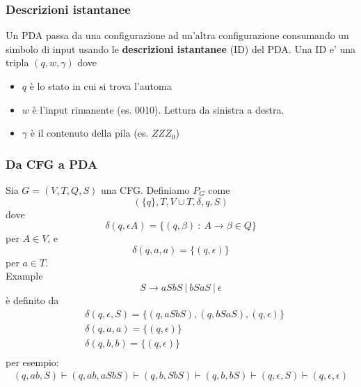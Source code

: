 \documentclass[12pt]{article}
\begin{document}
\subsubsection{Descrizioni istantanee}
Un PDA passa da una configurazione ad un’altra
configurazione consumando un simbolo di input usando le \textbf{descrizioni istantanee} (ID) del PDA. 
Una ID e’ una tripla $(q, w, \gamma)$ dove
\begin{itemize}
    \item $q$ è lo stato in cui si trova l'automa
    \item $w$ è l'input rimanente (es. 0010). Lettura da sinistra a destra.
    \item $\gamma$ è il contenuto della pila (es. $ZZZ_0$)
\end{itemize}

\subsubsection{Da CFG a PDA}
Sia $G=(V,T,Q,S)$ una CFG. Definiamo $P_G$ come
\begin{equation*}
    (\{q\},T,V \cup T,\delta,q,S)
\end{equation*}
dove
\begin{equation*}
    \delta(q,\epsilon A) = \{(q,\beta)\ :\ A \rightarrow \beta \in Q\}
\end{equation*}
per $A \in V$, e
\begin{equation*}
    \delta(q,a,a)=\{(q,\epsilon)\}
\end{equation*}
per $a \in T$.\\
Example
\begin{equation*}
    S \rightarrow aSbS\ |\ bSaS\ |\ \epsilon
\end{equation*}
è definito da
\begin{align*}
    &\delta(q,\epsilon,S)=\{(q,aSbS),(q,bSaS),(q,\epsilon)\}\\
    &\delta(q,a,a)=\{(q,\epsilon)\}\\
    &\delta(q,b,b)=\{(q,\epsilon)\}\\
\end{align*}
per esempio:
\begin{align*}
    (q,ab,S)\vdash(q,ab,aSbS)\vdash(q,b,SbS)\vdash(q,b,bS)\vdash(q,\epsilon,S)\vdash(q,\epsilon,\epsilon)
\end{align*}
\end{document}
